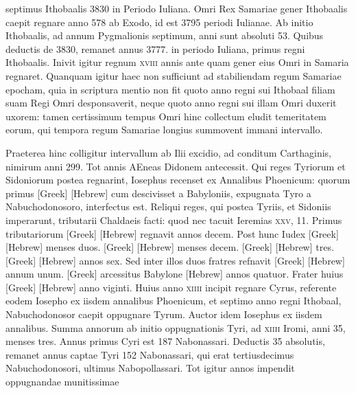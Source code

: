 septimus Ithobaalis 3830 in Periodo Iuliana.
Omri Rex Samariae
gener Ithobaalis caepit regnare anno 578 ab Exodo, id
est 3795 periodi Iulianae.
Ab initio Ithobaalis, ad annum Pygmalionis
septimum, anni sunt absoluti 53.
Quibus deductis de
3830, remanet annus 3777. in periodo Iuliana, primus regni
Ithobaalis.
Inivit igitur regnum \textsc{xviii} annis ante quam gener eius
Omri in Samaria regnaret.
Quanquam igitur haec non sufficiunt
ad stabiliendam regum Samariae epocham, quia in scriptura mentio
non fit quoto anno regni sui Ithobaal filiam suam Regi Omri desponsaverit,
neque quoto anno regni sui illam Omri duxerit uxorem:
tamen certissimum tempus Omri hinc collectum eludit temeritatem
eorum, qui tempora regum Samariae longius summovent
immani intervallo.

Praeterea hinc colligitur intervallum
ab Ilii excidio, ad conditum Carthaginis, nimirum anni 299.
Tot annis AEneas Didonem antecessit.
Qui reges Tyriorum et Sidoniorum
postea regnarint, Iosephus recenset ex Annalibus Phoenicum:
quorum primus \textgreek{[Greek]} \texthebrew{[Hebrew]}
 cum descivisset a Babyloniis,
expugnata Tyro a Nabuchodonosoro, interfectus est.
Reliqui reges, qui postea Tyriis, et Sidoniis imperarunt, tributarii
Chaldaeis facti: quod nec tacuit Ieremias \textsc{xxv}, 11.
Primus
tributariorum \textgreek{[Greek]} \texthebrew{[Hebrew]} regnavit annos decem.
Post hunc Iudex
\textgreek{[Greek]} \texthebrew{[Hebrew]} menses duos.
\textgreek{[Greek]} \texthebrew{[Hebrew]} menses decem.
\textgreek{[Greek]} \texthebrew{[Hebrew]} tres.
\textgreek{[Greek]} \texthebrew{[Hebrew]}
annos sex.
Sed inter illos duos fratres refnavit
 \textgreek{[Greek]} \texthebrew{[Hebrew]}
annum unum.
\textgreek{[Greek]} arcessitus Babylone
 \texthebrew{[Hebrew]} annos quatuor.
Frater huius \textgreek{[Greek]} \texthebrew{[Hebrew]} anno viginti.
Huius anno \textsc{xiiii}
incipit regnare Cyrus, referente eodem Iosepho ex iisdem annalibus
Phoenicum, et septimo anno regni Ithobaal, Nabuchodonosor
caepit oppugnare Tyrum.
Auctor idem Iosephus ex iisdem
annalibus.
Summa annorum ab initio oppugnationis Tyri, ad
\textsc{xiiii} Iromi, anni 35, menses tres.
Annus primus Cyri est 187 Nabonassari.
Deductis 35 absolutis, remanet annus captae Tyri 152
Nabonassari, qui erat tertiusdecimus Nabuchodonosori, ultimus
Nabopollassari.
Tot igitur annos impendit oppugnandae munitissimae
